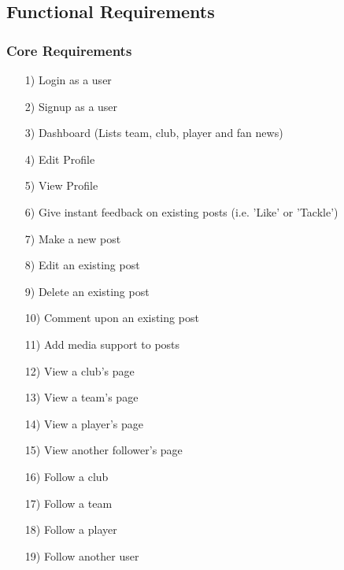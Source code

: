 \documentclass[10pt,a4paper]{article}
\begin{document}
\subsection{Functional Requirements}

\subsubsection{Core Requirements}
\begin{itemize}

\item[1)]
Login as a user

\item[2)]
Signup as a user

\item[3)]
Dashboard (Lists team, club, player and fan news)

\item[4)]
Edit Profile

\item[5)]
View Profile

\item[6)]
Give instant feedback on existing posts (i.e. 'Like' or 'Tackle')

\item[7)]
Make a new post

\item[8)]
Edit an existing post

\item[9)]
Delete an existing post

\item[10)]
Comment upon an existing post

\item[11)]
Add media support to posts

\item[12)]
View a club's page

\item[13)]
View a team's page

\item[14)]
View a player's page

\item[15)]
View another follower's page

\item[16)]
Follow a club

\item[17)]
Follow a team

\item[18)]
Follow a player

\item[19)]
Follow another user


\end{itemize}
\end{document}
